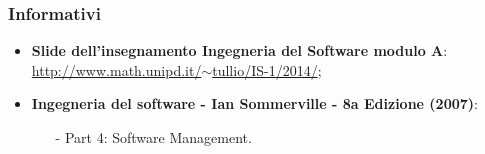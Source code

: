 \subsubsection{Informativi}
\begin{itemize}
	\item \textbf{Slide dell'insegnamento Ingegneria del Software modulo A}:\\ \href{http://www.math.unipd.it/~tullio/IS-1/2014/}{http://www.math.unipd.it/$\sim$tullio/IS-1/2014/};
	\item \textbf{Ingegneria del software - Ian Sommerville - 8a Edizione (2007)}:
		\begin{itemize}
		\item[-] Part 4: Software Management.
		\end{itemize}
\end{itemize}